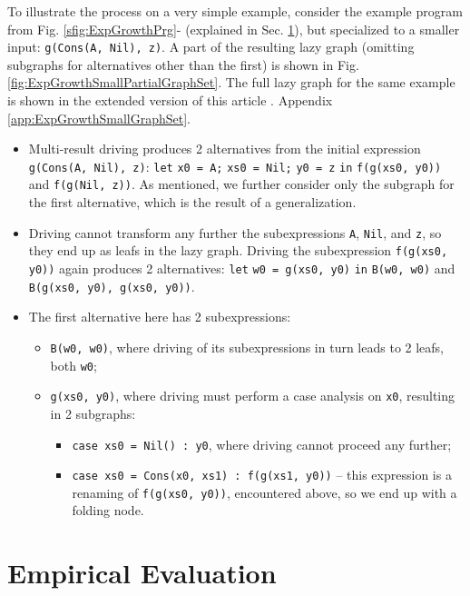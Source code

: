 \documentclass[submission,copyright,creativecommons]{eptcs}
\begin{document}
To illustrate the process on a very simple example, consider the example program from 
Fig. \ref{sfig:ExpGrowthPrg}- (explained in Sec. \ref{sec:EmpEval}), 
but specialized to a smaller input: \verb|g(Cons(A, Nil), z)|.
A part of the resulting lazy graph (omitting subgraphs for alternatives other than the first)
is shown in Fig. \ref{fig:ExpGrowthSmallPartialGraphSet}.
The full lazy graph for the same example is shown in 
\ifVptVer
the extended version of this article \cite{krustev2020MrscOptSizeReport}.
\else
Appendix \ref{app:ExpGrowthSmallGraphSet}.
\fi
\begin{itemize}
  \item Multi-result driving produces 2 alternatives from the initial expression \verb|g(Cons(A, Nil), z)|:
    \verb|let| \verb|x0 = A;| \verb|xs0 = Nil;| \verb|y0 = z| \verb|in| \verb|f(g(xs0, y0))| and \verb|f(g(Nil, z))|.
    As mentioned, we further consider only the subgraph for the first alternative, which
    is the result of a generalization.
  \item Driving cannot transform any further the subexpressions \verb|A|, \verb|Nil|, and \verb|z|, 
    so they end up as leafs in the lazy graph.
    Driving the subexpression \verb|f(g(xs0, y0))| again produces 2 alternatives:
    \verb|let| \verb|w0 = g(xs0, y0)| \verb|in| \verb|B(w0, w0)| and \verb|B(g(xs0, y0), g(xs0, y0))|.
  \item The first alternative here has 2 subexpressions: 
    \begin{itemize}
      \item \verb|B(w0, w0)|, where driving of its subexpressions in turn leads to 2 leafs, both \verb|w0|;
      \item \verb|g(xs0, y0)|, where driving must perform a case analysis on \verb|x0|, resulting in 2 subgraphs:
      \begin{itemize}
        \item \verb|case xs0 = Nil() : y0|, where driving cannot proceed any further;
        \item \verb|case xs0 = Cons(x0, xs1) : f(g(xs1, y0))| -- this expression is a renaming of
          \verb|f(g(xs0, y0))|, encountered above, so we end up with a folding node.
      \end{itemize}
    \end{itemize}
\end{itemize}

\section{Empirical Evaluation}\label{sec:EmpEval}
\end{document}
